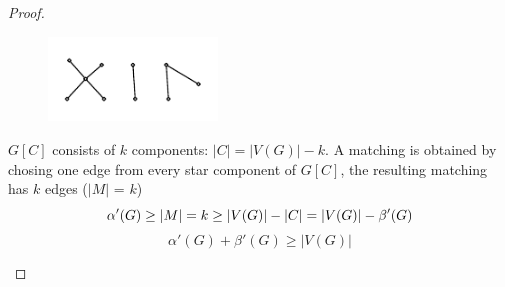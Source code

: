 \documentclass[notitlepage, 12pt]{article}
\begin{document}
\begin{proof}
\begin{itemize}
  \begin{figure}[h]
    \includegraphics[width=0.4\textwidth]{gallois-part-2-star.pdf}
    \centering
  \end{figure}
  $G[C]$ consists of $k$ components: $|C| = |V(G)| - k$. A matching is obtained
  by chosing one edge from every star component of $G[C]$, the resulting matching
  has $k$ edges ($|M|$ = $k$)
  \begin{equation*}
    \alpha'(G) \geq |M| = k \geq |V(G)| -|C| = |V(G)| - \beta'(G)\\
  \end{equation*}
  \begin{equation*}
    \alpha'(G) + \beta'(G) \geq |V(G)|
  \end{equation*}
\end{itemize}
\end{proof}
\newpage
\end{document}
